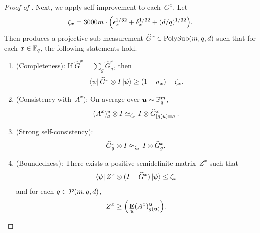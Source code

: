\begin{proof}[Proof of ]
Next, we apply self-improvement to each~$G^x$.
Let 
\begin{equation*}
\zeta_x = 3000m \cdot \Big(\epsilon_x^{1/32} + \delta_x^{1/32} + (d/q)^{1/32}\Big).
\end{equation*}
Then  produces
a projective sub-measurement $\widehat{G}^x \in \mathrm{PolySub}(m, q, d)$ such that
for each $x \in \mathbb F_q$, the following statements hold.
\begin{enumerate}
    \item(Completeness): If $\widehat{G}^x =  \sum_g \widehat{G}^x_g$, then
    \begin{equation*}
    \bra{\psi} \widehat{G}^x \otimes I \ket{\psi} \geq (1-\sigma_x) - \zeta_x.
    \end{equation*}
    \item(Consistency with~$A^x$): On average over $\boldsymbol{u} \sim \mathbb F_q^m$,
        \begin{equation*}
            (A^x)^u_a \otimes I \simeq_{\zeta_x} I \otimes \widehat{G}^x_{[g(u) = a]}.
        \end{equation*}
    \item(Strong self-consistency):
    	\begin{equation*}
		\widehat{G}^x_g \otimes I \approx_{\zeta_x} I \otimes \widehat{G}^x_g.
	\end{equation*}
    \item(Boundedness): There exists a positive-semidefinite matrix~$Z^x$ such that
    \begin{equation*}
        \bra{\psi} Z^x \otimes (I - \widehat{G}^x) \ket{\psi} \leq \zeta_x
    \end{equation*}
    and for each $g \in \mathcal{P}(m, q, d)$,
	\begin{equation*}
	Z^x \geq \Big( \mathop{\bf E\/}_{\boldsymbol{u}} (A^x)^{\boldsymbol{u}}_{g(\boldsymbol{u})}\Big).
	\end{equation*}
\end{enumerate}


\end{proof}

